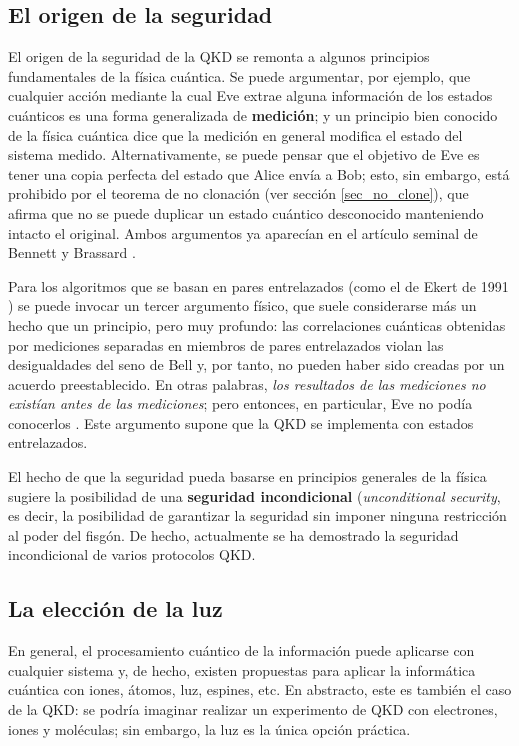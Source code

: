 \documentclass[a4paper,11pt]{book} %
\numberwithin{equation}{chapter}
\begin{document}
		\subsection{El origen de la seguridad}

El origen de la seguridad de la QKD se remonta a algunos principios fundamentales de la física cuántica. Se puede argumentar, por ejemplo, que cualquier acción mediante la cual Eve extrae alguna información de los estados cuánticos es una forma generalizada de \textbf{medición}; y un principio bien conocido de la física cuántica dice que la medición en general modifica el estado del sistema medido. Alternativamente, se puede pensar que el objetivo de Eve es tener una copia perfecta del estado que Alice envía a Bob; esto, sin embargo, está prohibido por el teorema de no clonación (ver sección \ref{sec_no_clone}), que afirma que no se puede duplicar un estado cuántico desconocido manteniendo intacto el original. Ambos argumentos ya aparecían en el artículo seminal de Bennett y Brassard \cite{bib_BB84}. 

Para los algoritmos que se basan en pares entrelazados (como el de Ekert de 1991 \cite{bib_Ekert-1991})  se puede invocar un tercer argumento físico, que suele considerarse más un hecho que un principio, pero muy profundo: las correlaciones cuánticas obtenidas por mediciones separadas en miembros de pares entrelazados violan las desigualdades del seno de Bell y, por tanto, no pueden haber sido creadas por un acuerdo preestablecido. En otras palabras, \textit{los resultados de las mediciones no existían antes de las mediciones}; pero entonces, en particular, Eve no podía conocerlos \cite{bib_Ekert-1991}. Este argumento supone que la QKD se implementa con estados entrelazados.		

El hecho de que la seguridad pueda basarse en principios generales de la física sugiere la posibilidad de una \textbf{seguridad incondicional} (\textit{unconditional security}, es decir, la posibilidad de garantizar la seguridad sin imponer ninguna restricción al poder del fisgón. De hecho, actualmente se ha demostrado la seguridad incondicional de varios protocolos QKD.
		
		\subsection{La elección de la luz}

En general, el procesamiento cuántico de la información puede aplicarse con cualquier sistema y, de hecho, existen propuestas para aplicar la informática cuántica con iones, átomos, luz, espines, etc. En abstracto, este es también el caso de la QKD: se podría imaginar realizar un experimento de QKD con electrones, iones y moléculas; sin embargo, la luz es la única opción práctica.
\end{document}
